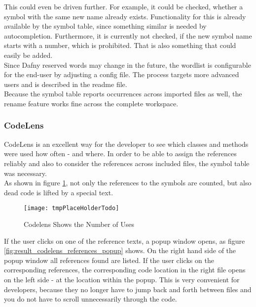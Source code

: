 This could even be driven further.
For example, it could be checked, whether a symbol with the same new name already exists.
Functionality for this is already available by the symbol table, since something similar is needed by autocompletion.
Furthermore, it is currently not checked, if the new symbol name starts with a number, which is prohibited.
That is also something that could easily be added. \\

Since Dafny reserved words may change in the future, the wordlist is configurable for the end-user by adjusting a config file.
The process targets more advanced users and is described in the readme file.\\

Because the symbol table reports occurrences across imported files as well, the rename feature works fine across the complete workspace.


\subsubsection{CodeLens}
CodeLens is an excellent way for the developer to see which classes and methods were used how often - and where.
In order to be able to assign the references reliably and
also to consider the references across included files, the symbol table was necessary. \\

As shown in figure \ref{fig:result_codelens_references},
not only the references to the symbols are counted,
but also dead code is lifted by a special text.

\begin{figure}[H]
    \centering
    \texttt{[image: tmpPlaceHolderTodo]}
    \caption{Codelens Shows the Number of Uses}
    \label{fig:result_codelens_references}
\end{figure}

If the user clicks on one of the reference texts, a popup window opens,
as figure \ref{fig:result_codelens_references_popup} shows.
On the right hand side of the popup window all references found are listed.
If the user clicks on the corresponding references, the corresponding code
location in the right file opens on the left side - at the location within the popup.
This is very convenient for developers,
because they no longer have to jump back and forth between files and you do not have to scroll unnecessarily
through the code.

